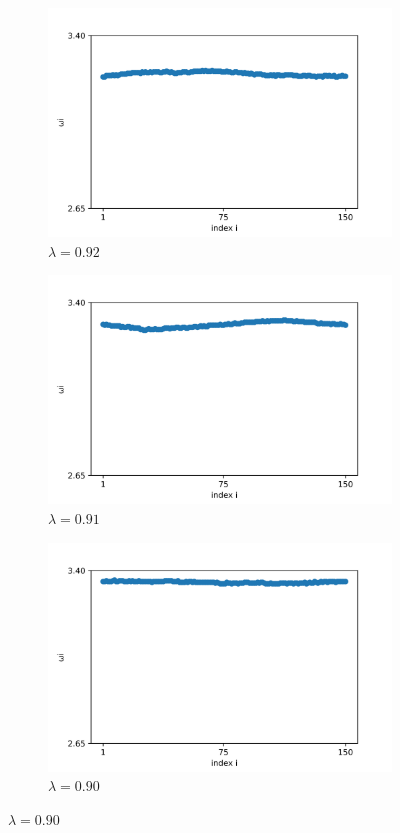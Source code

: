 \documentclass[a4paper,12pt]{article}
\begin{document}
\begin{figure}[H]
\begin{subfigure}{.32\textwidth}
  \includegraphics[width=1\linewidth]{w_lambda=0.92_t=2000}  
  \caption{$\lambda=0.92$}
\end{subfigure}
\centering
\begin{subfigure}{.32\textwidth}
  \centering
  \includegraphics[width=1\linewidth]{w_lambda=0.91_t=2000.png}  
  \caption{$\lambda=0.91$}
\end{subfigure}
\begin{subfigure}{.32\textwidth}
  \centering
  \includegraphics[width=1\linewidth]{w_lambda=0.9_t=2000.png}  
  \caption{$\lambda=0.90$}
\end{subfigure}


\end{figure}
\end{document}
